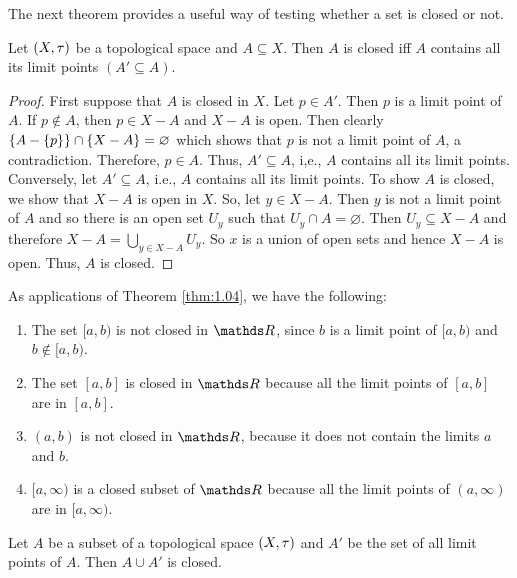 \documentclass[../main-sheet.tex]{subfiles}
\begin{document}
The next theorem provides a useful way of testing whether a set is closed or not.
\begin{thm}\label{thm:1.04}
    Let  \((X, \tau)\) be a topological space and  \(A \subseteq  X\).
    Then  \(A\) is closed iff  \(A\) contains all its limit points  \((A'\subseteq A)\).
\end{thm}
\begin{proof}
    First suppose that  \(A\) is closed in  \(X\). Let  \(p \in A'\). Then  \(p\) is
    a limit point of  \(A\). If  \(p \notin A\), then  \(p \in X-A\) and  \(X-A\) is open. Then clearly  \(\left\{A-\left\{p\right\}\right\}\cap \left\{X-A\right\}=\varnothing\) which shows that  \(p\) is not a limit point of  \(A\), a contradiction. Therefore,  \(p \in A\). Thus,  \(A'\subseteq  A\), i,e.,  \(A\) contains all its limit points.\\
    Conversely, let  \(A'\subseteq A\), i.e.,  \(A\) contains all its limit points. To
    show  \(A\) is closed, we show that  \(X-A\) is open in  \(X\). So, let
     \(y \in X-A\). Then  \(y\) is not a limit point of  \(A\) and so there is an
    open set  \(U_y\) such that  \(U_y \cap A=\varnothing\). Then  \(U_y\subseteq X-A\) and
    therefore  \(X-A=\bigcup_{y\in X-A}U_y\). So  \(x\) is a union of open sets
    and hence  \(X -A \) is open. Thus,  \(A\) is closed.
\end{proof}
\begin{ex}
    As applications of Theorem \ref{thm:1.04}, we have the
    following:
    \begin{enumerate}[label=(\roman*)]
        \item The set  \([a,b)\) is not closed in  \(\R\), since  \(b\) is a limit point of  \([a,b)\) and  \(b\notin [a,b)\).
        \item The set  \([a,b]\) is closed in  \(\R\) because all the limit points of  \([a,b]\) are in  \([a,b]\).
        \item  \((a,b)\) is not closed in  \(\R\), because it does not contain the limits  \(a\) and  \(b\).
        \item  \([a,\infty)\) is a closed subset of  \(\R\) because all the limit points of  \((a, \infty)\) are in  \([a, \infty)\).
    \end{enumerate}
\end{ex}
\begin{thm}
    Let  \(A\) be a subset of a topological space  \((X, \tau)\) and  \(A'\) be the set of all limit points of  \(A\). Then  \(A \cup A'\) is closed. \label{thm:1.05}
\end{thm}
\end{document}
